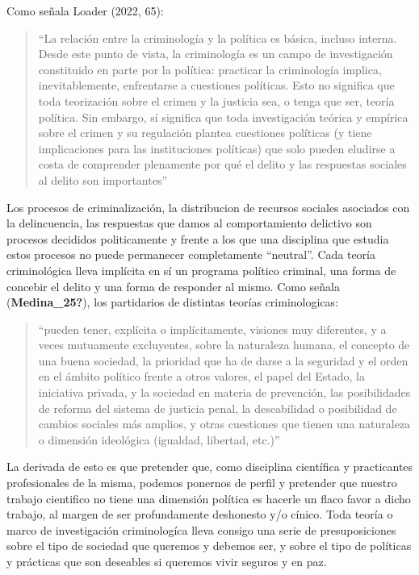 \documentclass[
  spanish,
  letterpaper,
  DIV=11,
  numbers=noendperiod]{scrreprt}
\begin{document}
Como señala Loader (2022, 65):

\begin{quote}
``La relación entre la criminología y la política es básica, incluso
interna. Desde este punto de vista, la criminología es un campo de
investigación constituido en parte por la política: practicar la
criminología implica, inevitablemente, enfrentarse a cuestiones
políticas. Esto no significa que toda teorización sobre el crimen y la
justicia sea, o tenga que ser, teoría política. Sin embargo, sí
significa que toda investigación teórica y empírica sobre el crimen y su
regulación plantea cuestiones políticas (y tiene implicaciones para las
instituciones políticas) que solo pueden eludirse a costa de comprender
plenamente por qué el delito y las respuestas sociales al delito son
importantes''
\end{quote}

Los procesos de criminalización, la distribucion de recursos sociales
asociados con la delincuencia, las respuestas que damos al
comportamiento delictivo son procesos decididos politicamente y frente a
los que una disciplina que estudia estos procesos no puede permanecer
completamente ``neutral''. Cada teoría criminológica lleva implícita en
sí un programa político criminal, una forma de concebir el delito y una
forma de responder al mismo. Como señala (\textbf{Medina\_25?}), los
partidarios de distintas teorías criminologicas:

\begin{quote}
``pueden tener, explícita o implícitamente, visiones muy diferentes, y a
veces mutuamente excluyentes, sobre la naturaleza humana, el concepto de
una buena sociedad, la prioridad que ha de darse a la seguridad y el
orden en el ámbito político frente a otros valores, el papel del Estado,
la iniciativa privada, y la sociedad en materia de prevención, las
posibilidades de reforma del sistema de justicia penal, la deseabilidad
o posibilidad de cambios sociales más amplios, y otras cuestiones que
tienen una naturaleza o dimensión ideológica (igualdad, libertad,
etc.)''
\end{quote}

La derivada de esto es que pretender que, como disciplina científica y
practicantes profesionales de la misma, podemos ponernos de perfil y
pretender que nuestro trabajo cientifico no tiene una dimensión política
es hacerle un flaco favor a dicho trabajo, al margen de ser
profundamente deshonesto y/o cínico. Toda teoría o marco de
investigación criminologíca lleva consigo una serie de presuposiciones
sobre el tipo de sociedad que queremos y debemos ser, y sobre el tipo de
políticas y prácticas que son deseables si queremos vivir seguros y en
paz.
\end{document}
